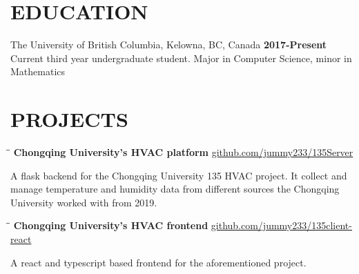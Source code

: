 \documentclass{res}
\begin{document}

\address{jimmy123good@hotmail.com \\ github.com/jummy233\\ jummy233.github.io/home \\ (250) 899 2600}
\begin{resume}

\section{EDUCATION}
The University of British Columbia, Kelowna, BC, Canada  \hspace{1.2in} \textbf{2017-Present}\\
    Current third year undergraduate student. Major in Computer Science, minor in Mathematics \\

\section{PROJECTS}

    \vspace{-0.1in}
    \begin{tabbing}
        \hspace{2.4in}\= \hspace{0.9in}\= \kill
        {\bf Chongqing University's HVAC platform} \>                   \>\url{github.com/jummy233/135Server}\\
    \end{tabbing}\vspace{-30pt}
    A flask backend for the Chongqing University 135 HVAC project. It collect and manage temperature and humidity data from
    different sources the Chongqing University worked with from 2019.

    \vspace{-0.2in}
    \begin{tabbing}
        \hspace{2.4in}\= \hspace{0.9in}\= \kill
        {\bf Chongqing University's HVAC frontend} \>                   \>\url{github.com/jummy233/135client-react}\\
    \end{tabbing}\vspace{-30pt}
    A react and typescript based frontend for the aforementioned project.


\end{resume}
\end{document}
